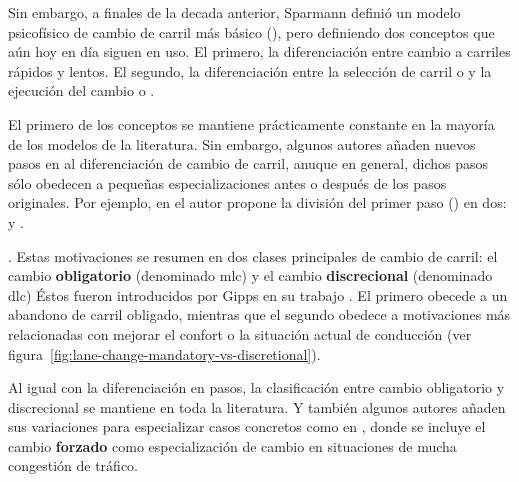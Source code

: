 Sin embargo, a finales de la decada anterior, Sparmann definió un modelo psicofísico de cambio de carril más básico (\cite{Sparmann1978}), pero definiendo dos conceptos que aún hoy en día siguen en uso. El primero, la diferenciación entre cambio a carriles rápidos y lentos. El segundo, la diferenciación entre la selección de carril o \textbf{} y la ejecución del cambio o \textbf{}.

El primero de los conceptos se mantiene prácticamente constante en la mayoría de los modelos de la literatura. Sin embargo, algunos autores añaden nuevos pasos en al diferenciación de cambio de carril, anuque en general, dichos pasos sólo obedecen a pequeñas especializaciones antes o después de los pasos originales. Por ejemplo, en \cite{Ahmed1999} el autor propone la división del primer paso (\textit{}) en dos: \textit{} y \textbf{}.

. Estas motivaciones se resumen en dos clases principales de cambio de carril: el cambio \textbf{obligatorio} (denominado \gls{mlc}) y el cambio \textbf{discrecional} (denominado \gls{dlc}) Éstos fueron introducidos por Gipps en su trabajo \cite{Gipps1986}. El primero obecede a un abandono de carril obligado, mientras que el segundo obedece a motivaciones más relacionadas con mejorar el confort o la situación actual de conducción (ver figura~\ref{fig:lane-change-mandatory-vs-discretional}).

Al igual con la diferenciación en pasos, la clasificación entre cambio obligatorio y discrecional se mantiene en toda la literatura. Y también algunos autores añaden sus variaciones para especializar casos concretos como en \cite{Ahmed1999}, donde se incluye el cambio \textbf{forzado} como especialización de cambio en situaciones de mucha congestión de tráfico.

